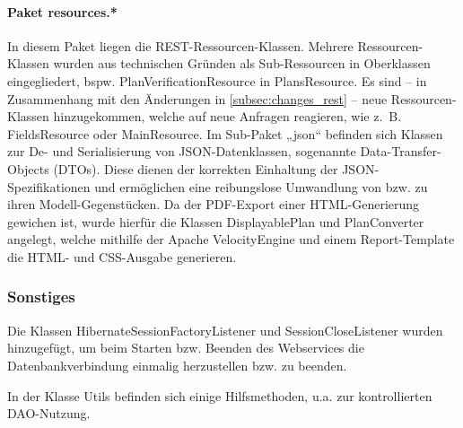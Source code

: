 \paragraph{Paket resources.*} In diesem Paket liegen die REST-Ressourcen-Klassen. Mehrere Ressourcen-Klassen wurden aus technischen Gründen als Sub-Ressourcen in Oberklassen eingegliedert, bspw. PlanVerificationResource in PlansResource. Es sind -- in Zusammenhang mit den Änderungen in \ref{subsec:changes_rest} -- neue Ressourcen-Klassen hinzugekommen, welche auf neue Anfragen reagieren, wie z.~B. FieldsResource oder MainResource. \newline
Im Sub-Paket „json“ befinden sich Klassen zur De- und Serialisierung von JSON-Datenklassen, sogenannte Data-Transfer-Objects (DTOs). Diese dienen der korrekten Einhaltung der JSON-Spezifikationen und ermöglichen eine reibungslose Umwandlung von bzw. zu ihren Modell-Gegenstücken. \newline
Da der PDF-Export einer HTML-Generierung gewichen ist, wurde hierfür die Klassen DisplayablePlan und PlanConverter angelegt, welche mithilfe der Apache VelocityEngine und einem Report-Template die HTML- und CSS-Ausgabe generieren.



\subsubsection{Sonstiges}

Die Klassen HibernateSessionFactoryListener und SessionCloseListener wurden hinzugefügt, um beim Starten bzw. Beenden des Webservices die Datenbankverbindung einmalig herzustellen bzw. zu beenden.

In der Klasse Utils befinden sich einige Hilfsmethoden, u.a. zur kontrollierten DAO-Nutzung.